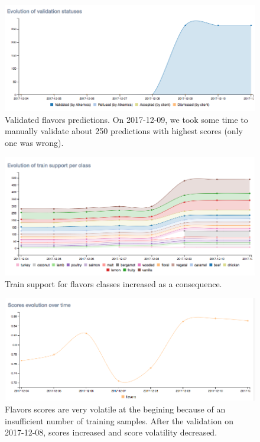 \begin{figure}[H]
\centering
\includegraphics[scale=0.5]{./images/incompletely-labeled/validation-flavors.png}
\caption{Validated flavors predictions. On 2017-12-09, we took some time to manually validate about 250 predictions with highest scores (only one was wrong).}
\end{figure}


\begin{figure}[H]
\centering
\includegraphics[scale=0.5]{./images/incompletely-labeled/train-support-flavors.png}
\caption{Train support for flavors classes increased as a consequence.}
\end{figure}


\begin{figure}[H]
\centering
\includegraphics[scale=0.5]{./images/incompletely-labeled/scores-flavors.png}
\caption{Flavors scores are very volatile at the begining because of an insufficient number of training samples. After the validation on 2017-12-08, scores increased and score volatility decreased.}
\end{figure}


